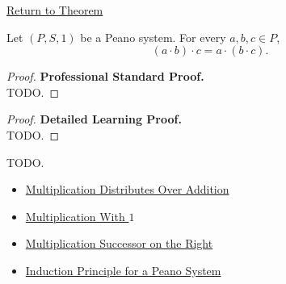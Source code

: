 \newpage
{}
\label{prf:multiplication-associative}

\begin{remark*}[Return]
\hyperref[thm:multiplication-associative]{Return to Theorem}
\end{remark*}

\begin{theorem*}
Let $(P,S,1)$ be a Peano system. For every $a,b,c \in P$,
\[
(a \cdot b) \cdot c = a \cdot (b \cdot c).
\]
\end{theorem*}

\begin{proof}
\textbf{Professional Standard Proof.}~\\
TODO.
\end{proof}

\begin{proof}
\textbf{Detailed Learning Proof.}~\\
TODO.
\end{proof}

\begin{remark*}
TODO.
\end{remark*}

\begin{dependencies}
\begin{itemize}
  \item \hyperref[thm:multiplication-distributes-over-addition]{Multiplication Distributes Over Addition}
  \item \hyperref[thm:multiplication-with-one]{Multiplication With $1$}
  \item \hyperref[thm:multiplication-successor-on-right]{Multiplication Successor on the Right}
  \item \hyperref[thm:induction-principle-for-peano-system]{Induction Principle for a Peano System}
\end{itemize}
\end{dependencies}
